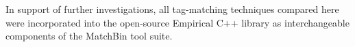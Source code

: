In support of further investigations, all tag-matching techniques compared here were incorporated into the open-source Empirical C++ library \citep{charles_ofria_2019_2575607} as interchangeable components of the MatchBin tool suite.













